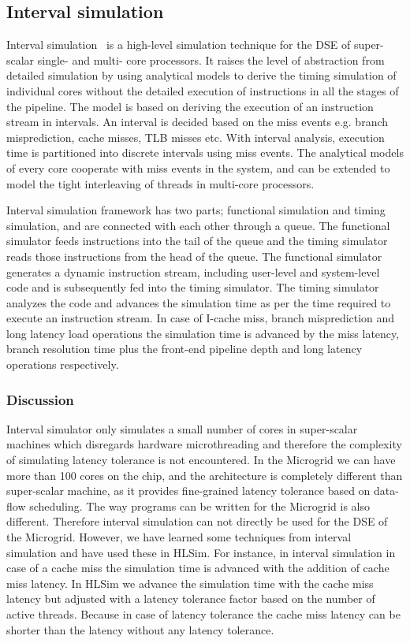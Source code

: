 \documentclass{article}
\begin{document}
\subsection{Interval simulation}

Interval simulation~\cite{Carlson:2011:SEL:2063384.2063454,GenbruggeEE10} is a
high-level simulation technique for the DSE of super-scalar single- and multi-
core processors. It raises the level of abstraction from detailed simulation by
using analytical models to derive the timing simulation of individual cores
without the detailed execution of instructions in all the stages of the
pipeline. The model is based on deriving the execution of an instruction stream
in intervals. An interval is decided based on the miss events e.g. branch
misprediction, cache misses, TLB misses etc. With interval analysis, execution
time is partitioned into discrete intervals using miss events. The analytical
models of every core cooperate with miss events in the system, and can be
extended to model the tight interleaving of threads in multi-core processors.

Interval simulation framework has two parts; functional simulation and timing
simulation, and are connected with each other through a queue. The functional
simulator feeds instructions into the tail of the queue and the timing
simulator reads those instructions from the head of the queue. The functional
simulator generates a dynamic instruction stream, including user-level and
system-level code and is subsequently fed into the timing simulator. The timing
simulator analyzes the code and advances the simulation time as per the time
required to execute an instruction stream. In case of I-cache miss, branch
misprediction and long latency load operations the simulation time is advanced
by the miss latency, branch resolution time plus the front-end pipeline depth
and long latency operations respectively.

\subsubsection*{Discussion}

Interval simulator only simulates a small number of cores in super-scalar
machines which disregards hardware microthreading and therefore the complexity
of simulating latency tolerance is not encountered. In the Microgrid we can
have more than 100 cores on the chip, and the architecture is completely
different than super-scalar machine, as it provides fine-grained latency
tolerance based on data-flow scheduling. The way programs can be written for
the Microgrid is also different. Therefore interval simulation can not directly
be used for the DSE of the Microgrid. However, we have learned some techniques
from interval simulation and have used these in HLSim. For instance, in
interval simulation in case of a cache miss the simulation time is advanced
with the addition of cache miss latency. In HLSim we advance the simulation
time with the cache miss latency but adjusted with a latency tolerance factor
based on the number of active threads. Because in case of latency tolerance the
cache miss latency can be shorter than the latency without any latency
tolerance.
\end{document}
